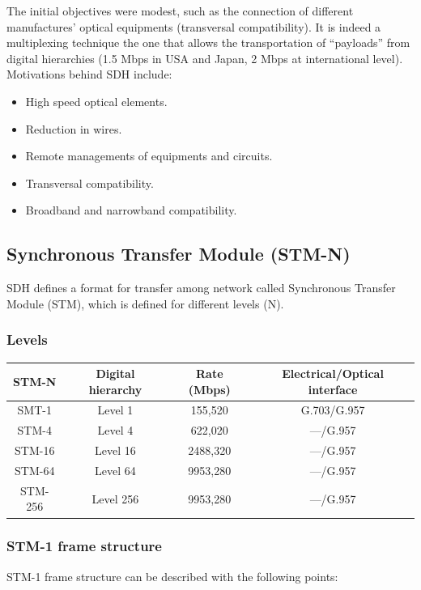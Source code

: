 \documentclass[
	12pt,
	twoside
]{book}
\begin{document}
The initial objectives were modest, such as the connection of different manufactures’ optical equipments (transversal compatibility). It is indeed a multiplexing technique the one that allows the transportation of ``payloads'' from digital hierarchies (1.5 Mbps in USA and Japan, 2 Mbps at international level). Motivations behind SDH include:

\begin{itemize}
	\item High speed optical elements.
	\item Reduction in wires.
	\item Remote managements of equipments and circuits.
	\item Transversal compatibility.
	\item Broadband and narrowband compatibility.
\end{itemize}

\subsection{Synchronous Transfer Module (STM-N)}

SDH defines a format for transfer among network called Synchronous Transfer Module (STM), which is defined for different levels (N).

\subsubsection{Levels}

\begin{tabular}{|c|c|c|c|}
	\hline
	STM-N	& Digital hierarchy	& Rate (Mbps)	& Electrical/Optical interface \\
	\hline
	SMT-1	& Level 1			& 155,520		& G.703/G.957 \\
	\hline
	STM-4	& Level 4			& 622,020		& ---/G.957 \\
	\hline
	STM-16	& Level 16			& 2488,320		& ---/G.957 \\
	\hline
	STM-64	& Level 64			& 9953,280		& ---/G.957 \\
	\hline
	STM-256	& Level 256			& 9953,280		& ---/G.957 \\
	\hline
\end{tabular}

\subsubsection{STM-1 frame structure}

STM-1 frame structure can be described with the following points:
\end{document}
